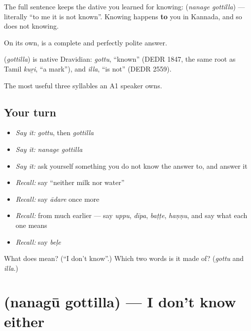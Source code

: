 The full sentence keeps the dative you learned for knowing: \textbf{ } (\emph{nanage gottilla}) — literally \textquotedblleft{}to me it is not known\textquotedblright{}. Knowing happens \textbf{to} you in Kannada, and so does not knowing.

On its own,  is a complete and perfectly polite answer.

\begin{cousinweb}
\textbf{} (\emph{gottilla}) is native Dravidian: \emph{gottu}, \textquotedblleft{}known\textquotedblright{} (DEDR 1847, the same root as Tamil \emph{kuṟi}, \textquotedblleft{}a mark\textquotedblright{}), and \emph{illa}, \textquotedblleft{}is not\textquotedblright{} (DEDR 2559).
\end{cousinweb}

\begin{grammarlens}[title={What you've built}]
The most useful three syllables an A1 speaker owns.
\end{grammarlens}

\subsection*{Your turn}
\begin{itemize}
\raggedright
  \item \emph{Say it:} \emph{gottu}, then \emph{gottilla}
  \item \emph{Say it:} \emph{nanage gottilla}
  \item \emph{Say it:} ask yourself something you do not know the answer to, and answer it
  \item \emph{Recall:} say \textquotedblleft{}neither milk nor water\textquotedblright{}
  \item \emph{Recall:} say \emph{ādare} once more
  \item \emph{Recall:} from much earlier — say \emph{uppu}, \emph{dīpa}, \emph{baṭṭe}, \emph{haṇṇu}, and say what each one means
  \item \emph{Recall:} say \emph{beḷe}
\end{itemize}

\begin{tcolorbox}[breakable,colback=teal!4,colframe=teal!35!black,title={Before you move on}]
What does  mean? (\textquotedblleft{}I don't know\textquotedblright{}.) Which two words is it made of? (\emph{gottu} and \emph{illa}.)
\end{tcolorbox}
\section[\texorpdfstring{\kn{ನನಗೂ} \kn{ಗೊತ್ತಿಲ್ಲ} (nanagū gottilla)}{ನನಗೂ ಗೊತ್ತಿಲ್ಲ (nanagū gottilla)}]{  (nanagū gottilla) — I don't know either}

